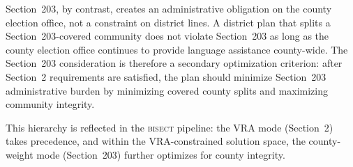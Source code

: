 Section~203, by contrast, creates an administrative obligation on the
county election office, not a constraint on district lines. A district plan
that splits a Section~203-covered community does not violate Section~203
as long as the county election office continues to provide language
assistance county-wide. The Section~203 consideration is therefore
a secondary optimization criterion: after Section~2 requirements are satisfied,
the plan should minimize Section~203 administrative burden by minimizing
covered county splits and maximizing community integrity.

This hierarchy is reflected in the \textsc{bisect} pipeline: the VRA mode
(Section~2) takes precedence, and within the VRA-constrained solution space,
the county-weight mode (Section~203) further optimizes for county integrity.
